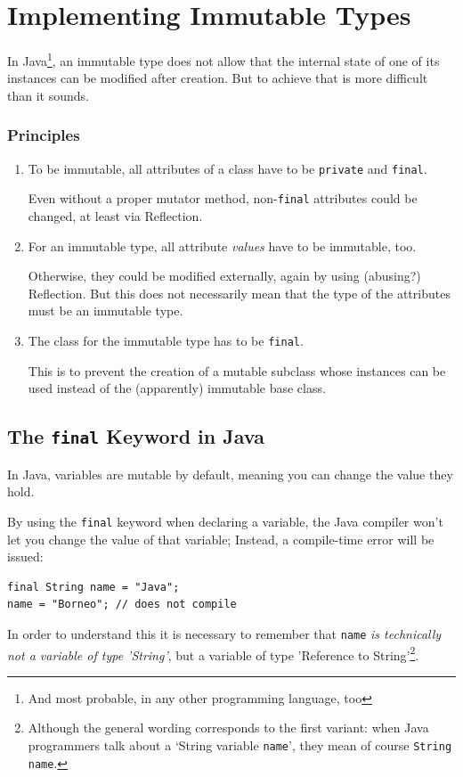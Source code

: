 \documentclass[11pt,a4paper, titlepage, parskip=half, headsepline, footsepline, cleardoublepage=current, headheight=1cm]{scrbook}
\begin{document}
\section{Implementing Immutable Types}\label{sec:ImmutableTypes}
In Java\footnote{And most probable, in any other programming language, too},  an immutable type does not allow that the internal state of one of its instances can be modified after creation. But to achieve that is more difficult than it sounds.


\subsubsection{Principles}
\begin{enumerate}[label=P\arabic*.]
\item{To be immutable, all attributes of a class have to be \lstinline|private| and \lstinline|final|.

Even without a proper mutator method, non-\lstinline|final| attributes could be changed, at least via Reflection.}

\item{For an immutable type, all attribute \textit{values} have to be immutable, too.

Otherwise, they could be modified externally, again by using (abusing?) Reflection. But this does not necessarily mean that the type of the attributes must be an immutable type.}

\item{The class for the immutable type has to be \lstinline|final|.

This is to prevent the creation of a mutable subclass whose instances can be used instead of the (apparently) immutable base class.}
\end{enumerate}

\subsection{The \lstinline|final| Keyword in Java}
In Java, variables are mutable by default, meaning you can change the value they hold.

By using the \lstinline|final| keyword when declaring a variable, the Java compiler won't let you change the value of that variable; Instead, a compile-time error will be issued:
\begin{lstlisting}
final String name = "Java";
name = "Borneo"; // does not compile
\end{lstlisting}
In order to understand this it is necessary to remember that \lstinline|name| \textit{is technically not a variable of type 'String'}, but a variable of type 'Reference to String'\footnote{Although the general wording corresponds to the first variant: when Java programmers talk about a ‘String variable \lstinline|name|’, they mean of course \lstinline|String name|.}.
\end{document}
